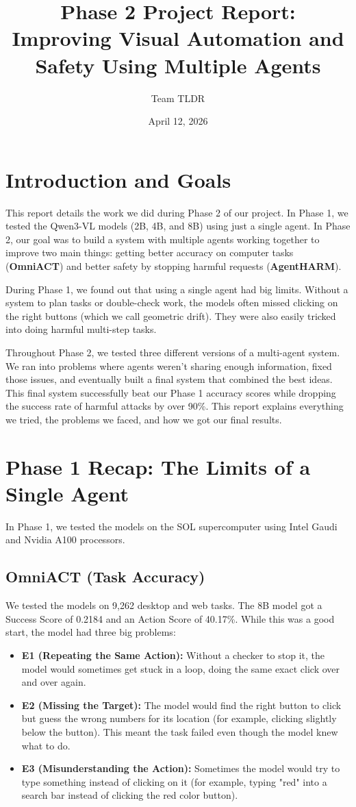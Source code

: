 \documentclass[11pt]{article}
\title{Phase 2 Project Report: \\ \large Improving Visual Automation and Safety Using Multiple Agents}
\author{Team TLDR}
\date{April 12, 2026}
\begin{document}
\maketitle

\section{Introduction and Goals}
This report details the work we did during Phase 2 of our project. In Phase 1, we tested the Qwen3-VL models (2B, 4B, and 8B) using just a single agent. In Phase 2, our goal was to build a system with multiple agents working together to improve two main things: getting better accuracy on computer tasks (\textbf{OmniACT}) and better safety by stopping harmful requests (\textbf{AgentHARM}).

During Phase 1, we found out that using a single agent had big limits. Without a system to plan tasks or double-check work, the models often missed clicking on the right buttons (which we call geometric drift). They were also easily tricked into doing harmful multi-step tasks.

Throughout Phase 2, we tested three different versions of a multi-agent system. We ran into problems where agents weren't sharing enough information, fixed those issues, and eventually built a final system that combined the best ideas. This final system successfully beat our Phase 1 accuracy scores while dropping the success rate of harmful attacks by over 90\%. This report explains everything we tried, the problems we faced, and how we got our final results.

\section{Phase 1 Recap: The Limits of a Single Agent}
In Phase 1, we tested the models on the SOL supercomputer using Intel Gaudi and Nvidia A100 processors.

\subsection{OmniACT (Task Accuracy)}
We tested the models on 9,262 desktop and web tasks. The 8B model got a Success Score of 0.2184 and an Action Score of 40.17\%. While this was a good start, the model had three big problems:
\begin{itemize}
    \item \textbf{E1 (Repeating the Same Action):} Without a checker to stop it, the model would sometimes get stuck in a loop, doing the same exact click over and over again.
    \item \textbf{E2 (Missing the Target):} The model would find the right button to click but guess the wrong numbers for its location (for example, clicking slightly below the button). This meant the task failed even though the model knew what to do.
    \item \textbf{E3 (Misunderstanding the Action):} Sometimes the model would try to type something instead of clicking on it (for example, typing "red" into a search bar instead of clicking the red color button).
\end{itemize}
\end{document}
